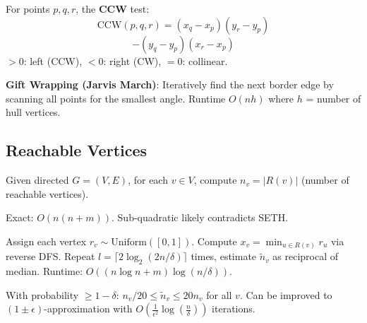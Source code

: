 \begin{definition}
	For points $p, q, r$, the \textbf{CCW} test:
	$$\text{CCW}(p,q,r) = (x_q\!-\!x_p)(y_r\!-\!y_p)$$
	$$- (y_q\!-\!y_p)(x_r\!-\!x_p)$$
	$> 0$: left (CCW), $< 0$: right (CW), $= 0$: collinear.
\end{definition}

\begin{theorem}
	\textbf{Gift Wrapping (Jarvis March)}: Iteratively find the next border edge by scanning all points for the smallest angle. Runtime $O(nh)$ where $h$ = number of hull vertices.
\end{theorem}

\subsection{Reachable Vertices}

\begin{definition}
	Given directed $G=(V,E)$, for each $v \in V$, compute $n_v = |R(v)|$ (number of reachable vertices).
\end{definition}

\begin{remark}
	Exact: $O(n(n+m))$. Sub-quadratic likely contradicts SETH.
\end{remark}

\begin{theorem}
	Assign each vertex $r_v \sim \text{Uniform}([0,1])$. Compute $x_v = \min_{u \in R(v)} r_u$ via reverse DFS. Repeat $l = \lceil 2\log_2(2n/\delta)\rceil$ times, estimate $\tilde{n}_v$ as reciprocal of median. Runtime: $O((n\log n + m)\log(n/\delta))$.
\end{theorem}

\begin{theorem}
	With probability $\geq 1 - \delta$: $n_v/20 \leq \tilde{n}_v \leq 20 n_v$ for all $v$. Can be improved to $(1 \pm \epsilon)$-approximation with $O(\frac{1}{\epsilon^2}\log(\frac{n}{\delta}))$ iterations.
\end{theorem}
